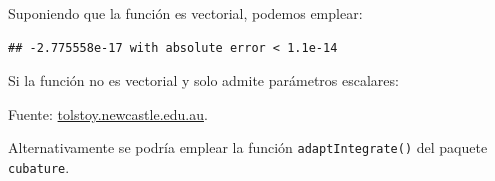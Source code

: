 \documentclass[
]{book}
\newenvironment{Shaded}{\begin{snugshade}}{\end{snugshade}}
\newcommand{\ControlFlowTok}[1]{\textcolor[rgb]{0.13,0.29,0.53}{\textbf{#1}}}
\newcommand{\FunctionTok}[1]{\textcolor[rgb]{0.00,0.00,0.00}{#1}}
\newcommand{\NormalTok}[1]{#1}
\newcommand{\SpecialCharTok}[1]{\textcolor[rgb]{0.00,0.00,0.00}{#1}}
\theoremstyle{break}
\theoremstyle{definition}
\theoremstyle{definition}
\theoremstyle{definition}
\theoremstyle{definition}
\theoremstyle{remark}
\begin{document}
Suponiendo que la función es vectorial, podemos emplear:

\begin{Shaded}
\end{Shaded}

\begin{verbatim}
## -2.775558e-17 with absolute error < 1.1e-14
\end{verbatim}

Si la función no es vectorial y solo admite parámetros escalares:

\begin{Shaded}
\end{Shaded}

Fuente: \href{http://tolstoy.newcastle.edu.au/R/help/04/10/5951.html}{tolstoy.newcastle.edu.au}.

Alternativamente se podría emplear la función \texttt{adaptIntegrate()} del paquete \texttt{cubature}.

  
\end{document}
